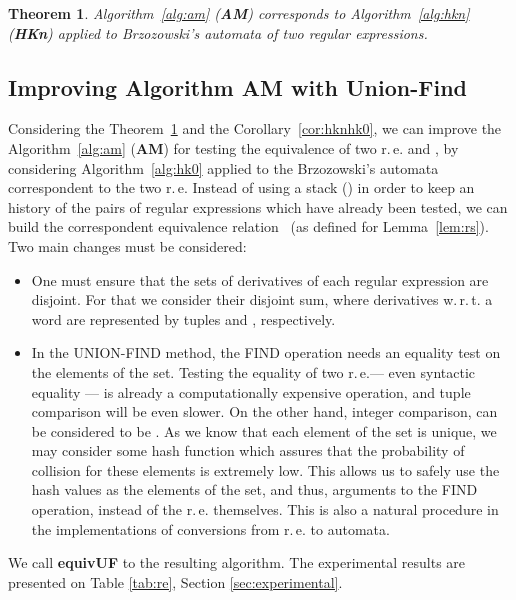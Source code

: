 \documentclass[copyright]{eptcs}
\newtheorem{theorem}{Theorem}
\newcommand{\re}{r.\,e.\xspace}
\newcommand{\equivuf}{\textbf{equivUF}\xspace}
\newcommand{\hkn}{\textbf{HKn}\xspace}
\newcommand{\am}{\textbf{AM}\xspace}
\begin{document}
\begin{theorem}\label{theor:amhk}
  Algorithm~\ref{alg:am} (\am) corresponds to Algorithm~\ref{alg:hkn} (\hkn) applied to Brzozowski's
  automata of two regular expressions.
\end{theorem}






\vspace{-0.3cm}
\subsection{Improving Algorithm \am with Union-Find}

Considering the Theorem~\ref{theor:amhk} and the
Corollary~\ref{cor:hknhk0}, we can improve the Algorithm~\ref{alg:am}
(\am) for testing the equivalence of two \re{} 
and , by considering Algorithm~\ref{alg:hk0} applied to the
Brzozowski's automata correspondent to the two \re Instead of using a
stack () in order to keep an history of the pairs of regular
expressions which have already been tested, we can build the
correspondent equivalence relation~ (as defined for
Lemma~\ref{lem:rs}). Two main changes must be considered:
\begin{itemize}
\item One must ensure that the sets of derivatives of each regular
  expression are disjoint. For that we consider their disjoint sum,
  where derivatives w.\,r.\,t. a word  are represented by tuples
   and ,
  respectively.
\item In the UNION-FIND method, the FIND operation needs an equality
  test on the elements of the set. Testing the equality of two \re ---
  even syntactic equality --- is already a computationally expensive
  operation, and tuple comparison will be even slower. On the other
  hand, integer comparison, can be considered to be . As we know
  that each element of the set is unique, we may consider some hash
  function which assures that the probability of collision for these
  elements is extremely low. This allows us to safely use the hash
  values as the elements of the set, and thus, arguments to the FIND
  operation, instead of the \re themselves. This is also a natural
  procedure in the implementations of conversions from \re to
  automata.
\end{itemize}

We call \equivuf{} to the resulting algorithm. The experimental results
are presented on Table \ref{tab:re}, Section \ref{sec:experimental}.
\end{document}
